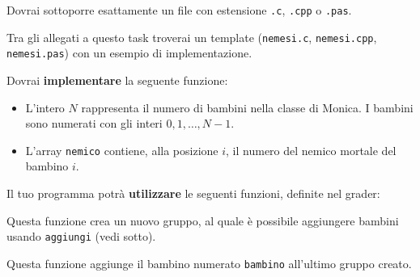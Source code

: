 \Implementation

Dovrai sottoporre esattamente un file con estensione \texttt{.c}, \texttt{.cpp} o \texttt{.pas}.

\begin{warning}
Tra gli allegati a questo task troverai un template (\texttt{nemesi.c}, \texttt{nemesi.cpp}, \texttt{nemesi.pas}) con un esempio di implementazione.
\end{warning}
\vspace{4mm}

\newcommand{\titoletto}[1]{\textbf{\large \textsf{Funzione} \texttt{#1}}\\[3mm]}

Dovrai \textbf{implementare} la seguente funzione:
\begin{itemize}[nolistsep]
	\begin{itemize}[nolistsep]
	  \item L'intero $N$ rappresenta il numero di bambini nella classe di Monica. I bambini sono numerati con gli interi $0, 1, \ldots, N - 1$.
	  \item L'array \texttt{nemico} contiene, alla posizione $i$, il numero del nemico mortale del bambino $i$.
	\end{itemize}
\end{itemize}

\medskip
Il tuo programma potrà \textbf{utilizzare} le seguenti funzioni, definite nel grader:
\begin{itemize}[nolistsep]

		Questa funzione crea un nuovo gruppo, al quale è possibile aggiungere bambini usando \texttt{aggiungi} (vedi sotto).\\

		
		Questa funzione aggiunge il bambino numerato \texttt{bambino} all'ultimo gruppo creato.
\end{itemize}

